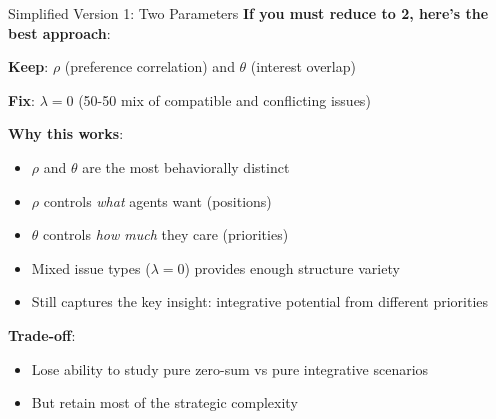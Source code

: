 \documentclass{beamer}
\begin{document}
\begin{frame}{Simplified Version 1: Two Parameters}
\textbf{If you must reduce to 2, here's the best approach}:

\vspace{0.5cm}

\textbf{Keep}: $\rho$ (preference correlation) and $\theta$ (interest overlap)

\textbf{Fix}: $\lambda = 0$ (50-50 mix of compatible and conflicting issues)

\vspace{0.5cm}

\textbf{Why this works}:
\begin{itemize}
    \item $\rho$ and $\theta$ are the most behaviorally distinct
    \item $\rho$ controls \textit{what} agents want (positions)
    \item $\theta$ controls \textit{how much} they care (priorities)
    \item Mixed issue types ($\lambda = 0$) provides enough structure variety
    \item Still captures the key insight: integrative potential from different priorities
\end{itemize}

\vspace{0.3cm}

\textbf{Trade-off}: 
\begin{itemize}
    \item Lose ability to study pure zero-sum vs pure integrative scenarios
    \item But retain most of the strategic complexity
\end{itemize}
\end{frame}
\end{document}
